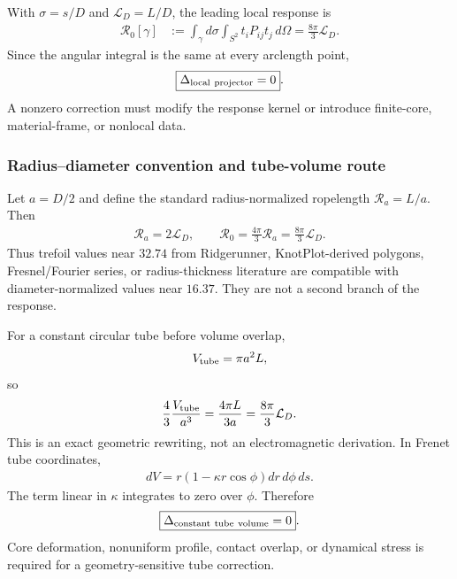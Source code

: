With \(\sigma=s/D\) and
\(\mathcal L_D=L/D\), the leading local response is
\begin{align}
    \mathscr R_0[\gamma]
    &:=
    \int_\gamma d\sigma
    \int_{S^2}t_iP_{ij}t_j\,d\Omega
    =
    \frac{8\pi}{3}\mathcal L_D.
    \label{eq:rt_alpha_leading_response_v0835}
\end{align}
Since the angular integral is the same at every arclength point,
\begin{align}
    \boxed{\Delta_{\rm local\ projector}=0}.
    \label{eq:rt_alpha_local_projector_no_go_v0835}
\end{align}
A nonzero correction must modify the response kernel or introduce finite-core,
material-frame, or nonlocal data.

\subsubsection{Radius--diameter convention and tube-volume route}

Let \(a=D/2\) and define the standard radius-normalized ropelength
\(\mathcal R_a=L/a\).  Then
\begin{align}
    \mathcal R_a
    =
    2\mathcal L_D,
    \qquad
    \mathscr R_0
    =
    \frac{4\pi}{3}\mathcal R_a
    =
    \frac{8\pi}{3}\mathcal L_D.
    \label{eq:rt_alpha_radius_diameter_v0835}
\end{align}
Thus trefoil values near \(32.74\) from Ridgerunner, KnotPlot-derived
polygons, Fresnel/Fourier series, or radius-thickness literature are
compatible with diameter-normalized values near \(16.37\).  They are not a
second branch of the response.

For a constant circular tube before volume overlap,
\begin{align}
    V_{\rm tube}
    =
    \pi a^2L,
\end{align}
so
\begin{align}
    \frac{4}{3}\frac{V_{\rm tube}}{a^3}
    =
    \frac{4\pi L}{3a}
    =
    \frac{8\pi}{3}\mathcal L_D.
    \label{eq:rt_alpha_tube_volume_identity_v0835}
\end{align}
This is an exact geometric rewriting, not an electromagnetic derivation.
In Frenet tube coordinates,
\begin{align}
    dV
    =
    r\left(1-\kappa r\cos\phi\right)
    dr\,d\phi\,ds.
\end{align}
The term linear in \(\kappa\) integrates to zero over \(\phi\).  Therefore
\begin{align}
    \boxed{\Delta_{\rm constant\ tube\ volume}=0}.
    \label{eq:rt_alpha_tube_volume_no_go_v0835}
\end{align}
Core deformation, nonuniform profile, contact overlap, or dynamical stress is
required for a geometry-sensitive tube correction.

